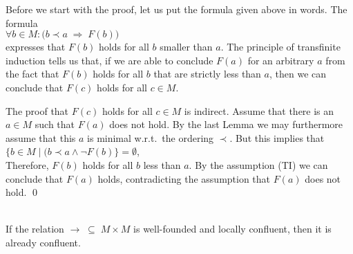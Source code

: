 \proof
Before we start with the proof, let us put the formula given above in words.  The formula
\\[0.2cm]
\hspace*{1.3cm}
$\forall b \in M: \bigl( b \prec a \;\Rightarrow\; F(b)\bigr)$
\\[0.2cm]
expresses that $F(b)$ holds for all $b$ smaller than $a$.  The principle of transfinite induction tells us that, if
we are able to conclude $F(a)$ for an arbitrary $a$ from the fact that $F(b)$ holds for all $b$ that are
strictly less than $a$, then we can conclude that $F(c)$ holds for all $c \in M$.

The proof that $F(c)$ holds for all $c \in M$ is indirect.  Assume that there is an $a \in M$ such that $F(a)$
does not hold.  By the last Lemma we may furthermore assume that this $a$ is minimal w.r.t.~the ordering
$\prec$.  But this implies that 
\\[0.2cm]
\hspace*{1.3cm}
$\bigl\{ b \in M \mid (b \prec a \wedge \neg F(b) \bigr\} = \emptyset$,
\\[0.2cm]
Therefore, $F(b)$ holds for all $b$ less than $a$.  By the assumption \textsf{(TI)} we can conclude that $F(a)$
holds, contradicting the assumption that $F(a)$ does not hold.
\qed

\begin{Theorem} \hspace*{\fill} \\
  If the relation $\rightarrow \;\subseteq\; M \times M$ is well-founded and locally confluent, then it is
  already confluent.
\end{Theorem}

